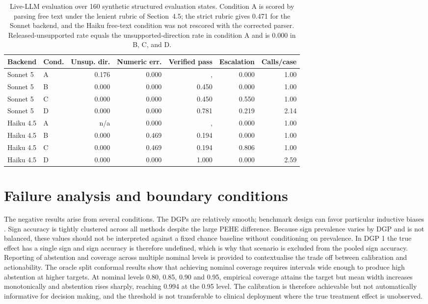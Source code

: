 \documentclass{article}
\begin{document}
\begin{table}[t]
\caption{Live-LLM evaluation over 160 synthetic structured evaluation states. Condition A is scored by parsing free text under the lenient rubric of Section~4.5; the strict rubric gives 0.471 for the Sonnet backend, and the Haiku free-text condition was not rescored with the corrected parser. Released-unsupported rate equals the unsupported-direction rate in condition A and is 0.000 in B, C, and D.}
\label{tab:llm}
\centering\footnotesize
\begin{tabular}{llrrrrr}\toprule
Backend & Cond. & Unsup. dir. & Numeric err. & Verified pass & Escalation & Calls/case\\\midrule
Sonnet 5 & A & 0.176 & 0.000 & ,  & 0.000 & 1.00\\
Sonnet 5 & B & 0.000 & 0.000 & 0.450 & 0.000 & 1.00\\
Sonnet 5 & C & 0.000 & 0.000 & 0.450 & 0.550 & 1.00\\
Sonnet 5 & D & 0.000 & 0.000 & 0.781 & 0.219 & 2.14\\\midrule
Haiku 4.5 & A & n/a & 0.000 & ,  & 0.000 & 1.00\\
Haiku 4.5 & B & 0.000 & 0.469 & 0.194 & 0.000 & 1.00\\
Haiku 4.5 & C & 0.000 & 0.469 & 0.194 & 0.806 & 1.00\\
Haiku 4.5 & D & 0.000 & 0.000 & 1.000 & 0.000 & 2.59\\\bottomrule
\end{tabular}
\end{table}

\section{Failure analysis and boundary conditions}
The negative results arise from several conditions. The DGPs are relatively smooth; benchmark design can favor particular inductive biases \citep{curth2021}. Sign accuracy is tightly clustered across all methods despite the large PEHE difference. Because sign prevalence varies by DGP and is not balanced, these values should not be interpreted against a fixed chance baseline without conditioning on prevalence. In DGP 1 the true effect has a single sign and sign accuracy is therefore undefined, which is why that scenario is excluded from the pooled sign accuracy. Reporting of abstention and coverage across multiple nominal levels is provided to contextualise the trade off between calibration and actionability. The oracle split conformal results show that achieving nominal coverage requires intervals wide enough to produce high abstention at higher targets. At nominal levels 0.80, 0.85, 0.90 and 0.95, empirical coverage attains the target but mean width increases monotonically and abstention rises sharply, reaching 0.994 at the 0.95 level. The calibration is therefore achievable but not automatically informative for decision making, and the threshold is not transferable to clinical deployment where the true treatment effect is unobserved.
\end{document}

